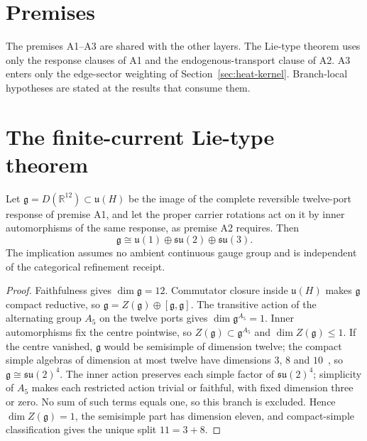\documentclass[11pt]{article}
\begin{document}
\section{Premises}
\label{sec:gauge-premises}

The premises A1--A3 are shared with the other layers. The Lie-type theorem
uses only the response clauses of A1 and the endogenous-transport clause of
A2. A3 enters only the edge-sector weighting of
Section~\ref{sec:heat-kernel}. Branch-local hypotheses are stated at the
results that consume them.



\section{The finite-current Lie-type theorem}
\label{sec:lie-type}

\begin{theorem}
\label{thm:current-algebra}\label{thm:finite-current-fixed-space}
Let \(\mathfrak g=D(\mathbb R^{12})\subset\mathfrak u(H)\) be the image of
the complete reversible twelve-port response of premise A1, and let the
proper carrier rotations act on it by inner automorphisms of the same
response, as premise A2 requires. Then
\[
\mathfrak g\cong
\mathfrak u(1)\oplus\mathfrak{su}(2)\oplus\mathfrak{su}(3).
\]
The implication assumes no ambient continuous gauge group and is
independent of the categorical refinement receipt.
\end{theorem}

\begin{proof}
Faithfulness gives \(\dim\mathfrak g=12\). Commutator closure inside
\(\mathfrak u(H)\) makes \(\mathfrak g\) compact reductive, so
\(\mathfrak g=Z(\mathfrak g)\oplus[\mathfrak g,\mathfrak g]\). The
transitive action of the alternating group \(A_5\) on the twelve ports gives
\(\dim\mathfrak g^{A_5}=1\). Inner automorphisms fix the centre pointwise,
so \(Z(\mathfrak g)\subset\mathfrak g^{A_5}\) and
\(\dim Z(\mathfrak g)\le1\). If the centre vanished, \(\mathfrak g\) would be
semisimple of dimension twelve; the compact simple algebras of dimension at
most twelve have dimensions \(3\), \(8\) and \(10\)~\cite{knapp2002}, so
\(\mathfrak g\cong\mathfrak{su}(2)^4\). The inner action preserves each
simple factor of \(\mathfrak{su}(2)^4\); simplicity of \(A_5\) makes each
restricted action trivial or faithful, with fixed dimension three or zero.
No sum of such terms equals one, so this branch is excluded. Hence
\(\dim Z(\mathfrak g)=1\), the semisimple part has dimension eleven, and
compact-simple classification gives the unique split \(11=3+8\).
\end{proof}
\end{document}
